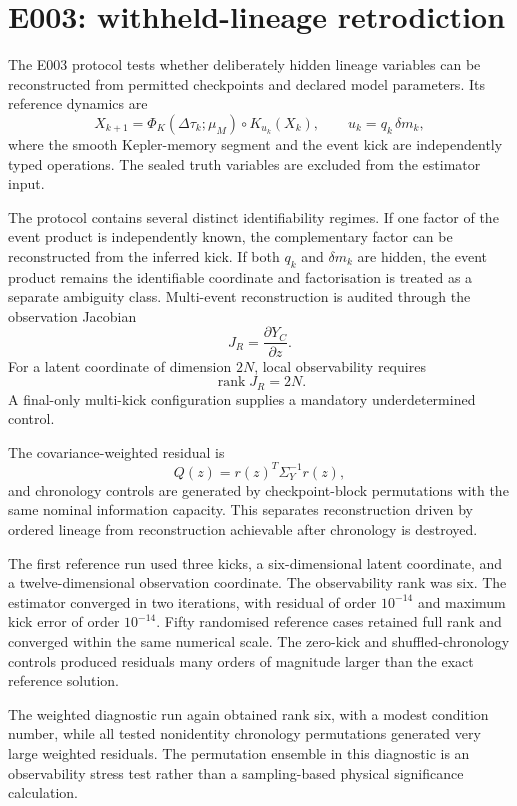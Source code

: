 \section{E003: withheld-lineage retrodiction}

The E003 protocol tests whether deliberately hidden lineage variables can be reconstructed from permitted checkpoints and declared model parameters. Its reference dynamics are
\[
X_{k+1}
=
\Phi_K(\Delta\tau_k;\mu_M)
\circ K_{u_k}(X_k),
\qquad
u_k=q_k\,\delta m_k,
\]
where the smooth Kepler-memory segment and the event kick are independently typed operations. The sealed truth variables are excluded from the estimator input.

The protocol contains several distinct identifiability regimes. If one factor of the event product is independently known, the complementary factor can be reconstructed from the inferred kick. If both \(q_k\) and \(\delta m_k\) are hidden, the event product remains the identifiable coordinate and factorisation is treated as a separate ambiguity class. Multi-event reconstruction is audited through the observation Jacobian
\[
J_R=\frac{\partial Y_C}{\partial z}.
\]
For a latent coordinate of dimension \(2N\), local observability requires
\[
\operatorname{rank}J_R=2N.
\]
A final-only multi-kick configuration supplies a mandatory underdetermined control.

The covariance-weighted residual is
\[
Q(z)=r(z)^T\Sigma_Y^{-1}r(z),
\]
and chronology controls are generated by checkpoint-block permutations with the same nominal information capacity. This separates reconstruction driven by ordered lineage from reconstruction achievable after chronology is destroyed.

The first reference run used three kicks, a six-dimensional latent coordinate, and a twelve-dimensional observation coordinate. The observability rank was six. The estimator converged in two iterations, with residual of order \(10^{-14}\) and maximum kick error of order \(10^{-14}\). Fifty randomised reference cases retained full rank and converged within the same numerical scale. The zero-kick and shuffled-chronology controls produced residuals many orders of magnitude larger than the exact reference solution.

The weighted diagnostic run again obtained rank six, with a modest condition number, while all tested nonidentity chronology permutations generated very large weighted residuals. The permutation ensemble in this diagnostic is an observability stress test rather than a sampling-based physical significance calculation.


